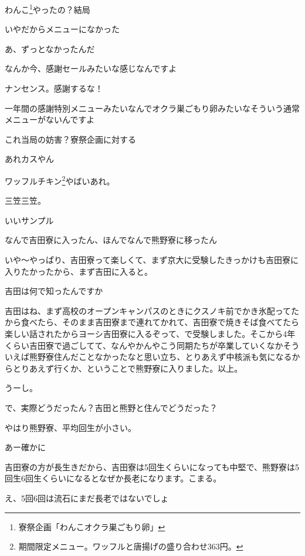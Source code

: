 \begin{multicols}{3}
わんこ\footnote{寮祭企画「わんこオクラ巣ごもり卵」}やったの？結局

いやだからメニューになかった

あ、ずっとなかったんだ

なんか今、感謝セールみたいな感じなんですよ

ナンセンス。感謝するな！

一年間の感謝特別メニューみたいなんでオクラ巣ごもり卵みたいなそういう通常メニューがないんですよ

これ当局の妨害？寮祭企画に対する

あれカスやん

ワッフルチキン\footnote{期間限定メニュー。ワッフルと唐揚げの盛り合わせ363円。}やばいあれ。

\vspace{5mm}


\noindent{}

三笠三笠。

いいサンプル

なんで吉田寮に入ったん、ほんでなんで熊野寮に移ったん

いや～やっぱり、吉田寮って楽しくて、まず京大に受験したきっかけも吉田寮に入りたかったから、まず吉田に入ると。

吉田は何で知ったんですか

吉田はね、まず高校のオープンキャンパスのときにクスノキ前でかき氷配ってたから食べたら、そのまま吉田寮まで連れてかれて、吉田寮で焼きそば食べてたら楽しい話されたからヨーシ吉田寮に入るぞって、で受験しました。そこから4年くらい吉田寮で過ごしてて、なんやかんやこう同期たちが卒業していくなかそういえば熊野寮住んだことなかったなと思い立ち、とりあえず中核派も気になるからとりあえず行くか、ということで熊野寮に入りました。以上。

うーし。

で、実際どうだったん？吉田と熊野と住んでどうだった？

やはり熊野寮、平均回生が小さい。

あー確かに

吉田寮の方が長生きだから、吉田寮は5回生くらいになっても中堅で、熊野寮は5回生6回生くらいになるとなぜか長老になります。こまる。

え、5回6回は流石にまだ長老ではないでしょ


\end{multicols}
